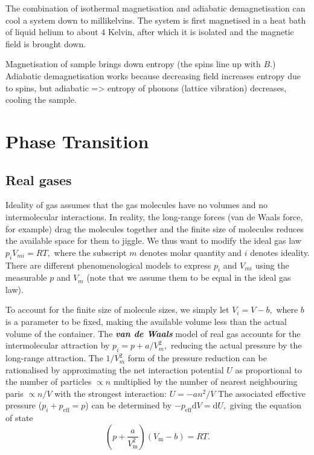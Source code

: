 \documentclass{article}
\theoremstyle{nonumberplain}
\begin{document}
The combination of isothermal magnetisation and adiabatic demagnetisation can cool a system down to millikelvins. The system is first magnetised in a heat bath of liquid helium to about $4$ Kelvin, after which it is isolated and the magnetic field is brought down. 

Magnetisation of sample brings down entropy (the spins line up with $B$.) Adiabatic demagnetisation works because decreasing field increases entropy due to spins, but adiabatic => entropy of phonons (lattice vibration) decreases, cooling the sample. 
\section{Phase Transition}
\subsection{Real gases}
Ideality of gas assumes that the gas molecules have no volumes and no intermolecular interactions. In reality, the long-range forces (van de Waals force, for example) drag the molecules together and the finite size of molecules reduces the available space for them to jiggle. We thus want to modify the ideal gas law $p_i V_{mi} = R T,$ where the subscript $m$ denotes molar quantity and $i$ denotes ideality. There are different phenomenological models to express $p_i$ and $V_{mi}$ using the measurable $p$ and $V_m$ (note that we assume them to be equal in the ideal gas law). 

To account for the finite size of molecule sizes, we simply let $V_i = V - b,$ where $b$ is a parameter to be fixed, making the available volume less than the actual volume of the container. The \textit{\textbf{van de Waals}} model of real gas accounts for the intermolecular attraction by $p_i = p + a/V_m^2,$ reducing the actual pressure by the long-range attraction. The $1 / V_m^2$ form of the pressure reduction can be rationalised by approximating the net interaction potential $U$ as proportional to the number of particles $\propto n$ multiplied by the number of nearest neighbouring paris $ \propto n/V$ with the strongest interaction: $U = -a n^2 /V$ The associated effective pressure ($p_i + p_{\mathrm{eff}} = p$) can be determined by $-p_{\mathrm{eff}} \mathrm{d}V = \mathrm{d} U,$ giving the equation of state 
\begin{equation}
    \label{eq:vdw-eq}
    \boxed{
        \left( p + \frac{a}{V_\mathrm{m}^2}\right) (V_\mathrm{m}  - b) = RT.
    }
\end{equation}
\end{document}
